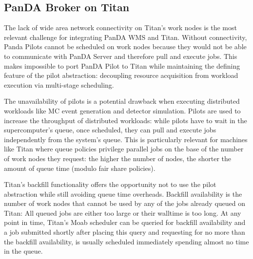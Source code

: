 

\subsection{PanDA Broker on Titan}
\label{ssec:panda_titan}

The lack of wide area network connectivity on Titan's work nodes is the most
relevant challenge for integrating PanDA WMS and Titan. Without connectivity,
Panda Pilots cannot be scheduled on work nodes because they would not be able to
communicate with PanDA Server and therefore pull and execute jobs. This makes
impossible to port PanDA Pilot to Titan while maintaining the defining feature
of the pilot abstraction: decoupling resource acquisition from workload
execution via multi-stage scheduling.

The unavailability of pilots is a potential drawback when executing distributed
workloads like MC event generation and detector simulation. Pilots are used to
increase the throughput of distributed workloads: while pilots have to wait in
the supercomputer's queue, once scheduled, they can pull and execute jobs
independently from the system's queue. This is particularly relevant for
machines like Titan where queue policies privilege parallel jobs on the base of
the number of work nodes they request: the higher the number of nodes, the
shorter the amount of queue time (modulo fair share policies).


Titan's backfill functionality offers the opportunity not to use the pilot
abstraction while still avoiding queue time overheads. Backfill availability is
the number of work nodes that cannot be used by any of the jobs already queued
on Titan: All queued jobs are either too large or their walltime is too long. At
any point in time, Titan's Moab scheduler can be queried for backfill
availability and a job submitted shortly after placing this query and requesting
for no more than the backfill availability, is usually scheduled immediately
spending almost no time in the queue.

